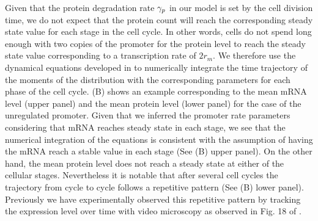 Given that the protein degradation rate $\gamma _p$ in our model is set by the cell
division time, we do not expect that the protein count will reach the
corresponding steady state value for each stage in the cell cycle. In other
words, cells do not spend long enough with two copies of the promoter for the
protein level to reach the steady state value corresponding to a transcription
rate of $2 r_m$. We therefore use the dynamical equations developed in
 to numerically integrate the time trajectory of the
moments of the distribution with the corresponding parameters for each phase of
the cell cycle. (B) shows an example corresponding to the
mean mRNA level (upper panel) and the mean protein level (lower panel) for the
case of the unregulated promoter. Given that we inferred the promoter rate
parameters considering that mRNA reaches steady state in each stage, we see
that the numerical integration of the equations is consistent with the
assumption of having the mRNA reach a stable value in each stage (See
(B) upper panel). On the other hand, the mean protein
level does not reach a steady state at either of the cellular stages.
Nevertheless it is notable that after several cell cycles the trajectory from
cycle to cycle follows a repetitive pattern (See (B)
lower panel). Previously we have experimentally observed this repetitive
pattern by tracking the expression level over time with video microscopy as
observed in Fig. 18 of \cite{Phillips2019}.

